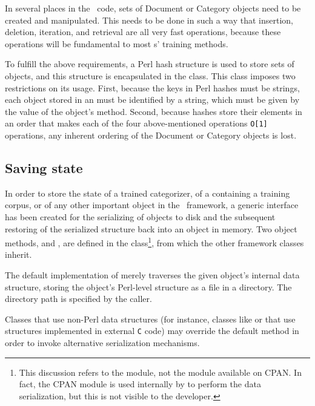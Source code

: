 In several places in the \aicat\ code, sets of Document or Category
objects need to be created and manipulated.  This needs to be done in
such a way that insertion, deletion, iteration, and retrieval are all
very fast operations, because these operations will be fundamental to
most s' training methods.

To fulfill the above requirements, a Perl hash structure is used to
store sets of objects, and this structure is encapsulated in the
 class.  This class imposes two restrictions on its
usage.  First, because the keys in Perl hashes must be strings, each
object stored in an  must be identified by a string,
which must be given by the value of the object's 
method.  Second, because hashes store their elements in an order that
makes each of the four above-mentioned operations \texttt{O[1]}
operations, any inherent ordering of the Document or Category objects
is lost.

\subsection{Saving state}
\label{saving-state}

In order to store the state of a trained categorizer, of a
 containing a training corpus, or of any other
important object in the \aicat\ framework, a generic interface has
been created for the serializing of objects to disk and the subsequent
restoring of the serialized structure back into an object in memory.
Two object methods,  and ,
are defined in the  class\footnote{This discussion
  refers to the  module, not the
   module available on CPAN.  In fact, the
   CPAN module is used internally by
   to perform the data serialization,
  but this is not visible to the developer.}, from which the other
framework classes inherit.

The default implementation of  merely traverses
the given object's internal data structure, storing the object's
Perl-level structure as a file in a directory.  The directory path is
specified by the caller.

Classes that use non-Perl data structures (for instance, classes like
 or  that use
structures implemented in external \texttt{C} code) may override the
default  method in order to invoke alternative
serialization mechanisms.
